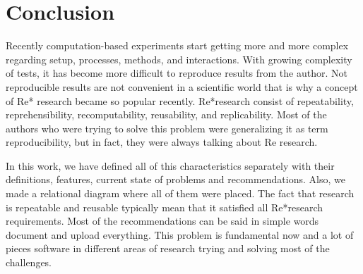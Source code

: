 \section{Conclusion}
Recently computation-based experiments start getting more and more complex regarding setup, processes, methods, and interactions. With growing complexity of tests, it has become more difficult to reproduce results from the author. Not reproducible results are not convenient in a scientific world that is why a concept of Re* research became so popular recently. Re*research consist of repeatability, reprehensibility, recomputability, reusability, and replicability. Most of the authors who were trying to solve this problem were generalizing it as term reproducibility, but in fact, they were always talking about Re research. \par
In this work, we have defined all of this characteristics separately with their definitions, features, current state of problems and recommendations. Also, we made a relational diagram where all of them were placed. The fact that research is repeatable and reusable typically mean that it satisfied all Re*research requirements. Most of the recommendations can be said in simple words document and upload everything. This problem is fundamental now and a lot of pieces software in different areas of research trying and solving most of the challenges. 
